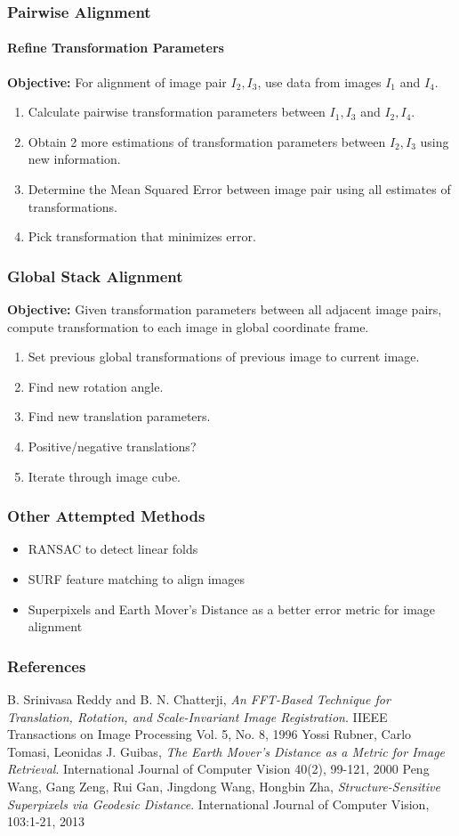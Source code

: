 \documentclass{beamer}
\begin{document}
\begin{frame}
\frametitle{Pairwise Alignment}
\framesubtitle{Refine Transformation Parameters}
\textbf{Objective:} For alignment of image pair $I_2, I_3$, use data from images $I_1$ and $I_4$. \\
\begin{enumerate}
\item Calculate pairwise transformation parameters between $I_1,I_3$ and $I_2,I_4$.
\item Obtain 2 more estimations of transformation parameters between $I_2,I_3$ using new information.
\item Determine the Mean Squared Error between image pair using all estimates of transformations.
\item Pick transformation that minimizes error.
\end{enumerate}
\end{frame}

\begin{frame}
\frametitle{Global Stack Alignment}
\textbf{Objective:} Given transformation parameters between all adjacent image pairs, compute transformation to each image in global coordinate frame.
\begin{enumerate}
\item Set previous global transformations of previous image to current image. 
\item Find new rotation angle.
\item Find new translation parameters.
\item Positive/negative translations? 
\item Iterate through image cube. 
\end{enumerate}
\end{frame}

\begin{frame}
\frametitle{Other Attempted Methods}
\begin{itemize}
\item RANSAC to detect linear folds
\item SURF feature matching to align images
\item Superpixels and Earth Mover's Distance as a better error metric for image alignment
\end{itemize}
\end{frame}

\begin{frame}
\frametitle{References}
\begin{thebibliography}{9}
	B. Srinivasa Reddy and B. N. Chatterji,
	\emph{An FFT-Based Technique for Translation, Rotation, and Scale-Invariant Image Registration}.
	IIEEE Transactions on Image Processing Vol. 5, No. 8, 1996
	Yossi Rubner, Carlo Tomasi, Leonidas J. Guibas,
	\emph{The Earth Mover's Distance as a Metric for Image Retrieval}.
	International Journal of Computer Vision 40(2), 99-121, 2000
	Peng Wang, Gang Zeng, Rui Gan, Jingdong Wang, Hongbin Zha,
	\emph{Structure-Sensitive Superpixels via Geodesic Distance}.
	International Journal of Computer Vision, 103:1-21, 2013
\end{thebibliography} 
\end{frame}
\end{document}
